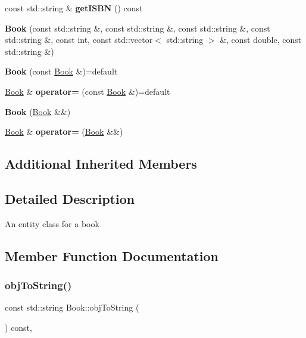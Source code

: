\begin{DoxyCompactItemize}
const std\+::string \& {\bfseries get\+I\+S\+BN} () const
\item 
\mbox{\label{classBook_a527ba637e1d53f576a1053b585a5a2d7}} 
{\bfseries Book} (const std\+::string \&, const std\+::string \&, const std\+::string \&, const std\+::string \&, const int, const std\+::vector$<$ std\+::string $>$ \&, const double, const std\+::string \&)
\item 
\mbox{\label{classBook_acfa629d5efd20ca022ff2352cb5f694d}} 
{\bfseries Book} (const \hyperlink{classBook}{Book} \&)=default
\item 
\mbox{\label{classBook_a04596dfcbb51d63e6289d157a58586ec}} 
\hyperlink{classBook}{Book} \& {\bfseries operator=} (const \hyperlink{classBook}{Book} \&)=default
\item 
\mbox{\label{classBook_a62d93c42123190e41ac81af98558a7b4}} 
{\bfseries Book} (\hyperlink{classBook}{Book} \&\&)
\item 
\mbox{\label{classBook_a542ef4c3b209b0c7fe173ef963fcb5b3}} 
\hyperlink{classBook}{Book} \& {\bfseries operator=} (\hyperlink{classBook}{Book} \&\&)
\end{DoxyCompactItemize}
\subsection*{Additional Inherited Members}


\subsection{Detailed Description}
An entity class for a book 

\subsection{Member Function Documentation}
\mbox{\label{classBook_a693f08d322fa1395e5bc1f864c380b66}} 
\subsubsection{\texorpdfstring{obj\+To\+String()}{objToString()}}
{\footnotesize\ttfamily const std\+::string Book\+::obj\+To\+String (\begin{DoxyParamCaption}{ }\end{DoxyParamCaption}) const\hspace{0.3cm}{\ttfamily [override]}, {\ttfamily [virtual]}}

